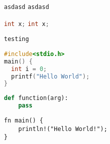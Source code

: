 \documentclass{article}
\begin{document}


\lstinline|asdasd|
\lstinline{asdasd}

\lstinline[language=C]|int x;|
\lstinline[language=C]{int x;}

\begin{lstlisting}
testing
\end{lstlisting}

\begin{lstlisting}[directivestyle={\color{black}},
                   language=C,
                   emph={int,char,double,float,unsigned},
                   emphstyle={\color{blue}}]
#include<stdio.h>
main() {
  int i = 0;
  printf("Hello World");
}
\end{lstlisting}

\begin{lstlisting}[language=python]
def function(arg):
    pass
\end{lstlisting}

\lstset{language=rust,numbers=none}
\begin{lstlisting}
fn main() {
    println!("Hello World!");
}
\end{lstlisting}

\lstset{language=x,numbers=none}
\end{document}
